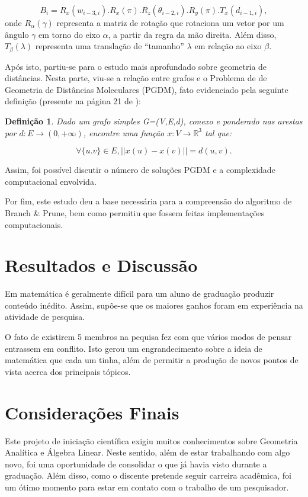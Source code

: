 \documentclass[
	12pt,				%
	openright,			%
	twoside,			%
	a4paper,			%
	english,			%
	french,				%
	spanish,			%
	brazil				%
	]{abntex2}
\newtheorem{definicao}{Definição}[section]
\begin{document}
$$B_i=R_{x}(w_{i-3,i}).R_{x}(\pi).R_{z}(\theta_{i-2,i}).R_{y}(\pi).T_{x}(d_{i-1,i}),
$$
onde $R_{\alpha}(\gamma)$ representa a matriz de rotação que rotaciona um vetor por um ângulo $\gamma$ em torno do eixo $\alpha$, a partir da regra da mão direita. Além disso, $T_{\beta}(\lambda)$ representa uma translação de ``tamanho'' $\lambda$ em relação ao eixo $\beta$.  

Após isto, partiu-se para o estudo mais aprofundado sobre geometria de distâncias. Nesta parte, viu-se a relação entre grafos e o Problema de de Geometria de Distâncias Moleculares (PGDM), fato evidenciado pela seguinte definição (presente na página 21 de \cite{1}):

\begin{definicao}
Dado um grafo simples G=(V,E,d), conexo e ponderado nas arestas por $d:E\rightarrow(0,+\infty)$, encontre uma função $x:V\rightarrow\mathbb{R}^3$ tal que:

$$\forall\{u.v\}\in E, ||x(u)-x(v)||=d(u,v).$$
\end{definicao}
Assim, foi possível discutir o número de soluções PGDM e a complexidade computacional envolvida.

Por fim, este estudo deu a base necessária para a compreensão do algoritmo de Branch \& Prune, bem como permitiu que fossem feitas implementações computacionais. 
\chapter{Resultados e Discussão}
Em matemática é geralmente difícil para um aluno de graduação produzir conteúdo inédito. Assim, supõe-se que os maiores ganhos foram em experiência na atividade de pesquisa. 

O fato de existirem 5 membros na pequisa fez com que vários modos de pensar entrassem em conflito. Isto gerou um engrandecimento sobre a ideia de matemática que cada um tinha, além de permitir a produção de novos pontos de vista acerca dos principais tópicos.

\chapter{Considerações Finais}
Este projeto de iniciação científica exigiu muitos conhecimentos sobre Geometria Analítica e Álgebra Linear. Neste sentido, além de estar trabalhando com algo novo, foi uma oportunidade de consolidar o que já havia visto durante a graduação. Além disso, como o discente pretende seguir carreira acadêmica, foi um ótimo momento para estar em contato com o trabalho de um pesquisador.
\end{document}
